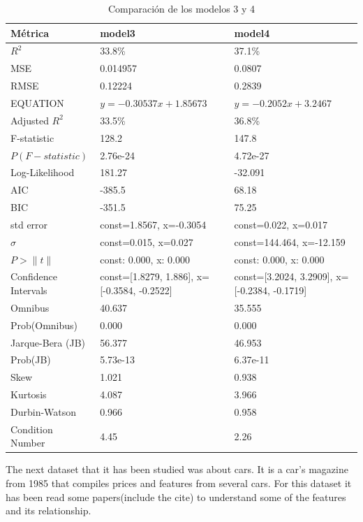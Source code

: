\documentclass{article}
\begin{document}
  \begin{table}[h]
  \centering
  \small %
  \begin{tabular}{|l|l|l|}
  \hline
  \textbf{Métrica} & \textbf{model3} & \textbf{model4} \\
  \hline
  $R^2$ & 33.8\% & 37.1\% \\
  \hline
  MSE & 0.014957 & 0.0807 \\
  \hline
  RMSE & 0.12224 & 0.2839 \\
  \hline
  EQUATION & $y=-0.30537x+1.85673$ & $y=-0.2052x+3.2467$ \\
  \hline
  Adjusted $R^2$ & 33.5\% & 36.8\% \\
  \hline
  F-statistic & 128.2 & 147.8 \\
  \hline
  $P(F-statistic)$ & 2.76e-24 & 4.72e-27 \\
  \hline
  Log-Likelihood & 181.27 & -32.091 \\
  \hline
  AIC & -385.5 & 68.18 \\
  \hline
  BIC & -351.5 & 75.25 \\
  \hline
  std error & const=1.8567, x=-0.3054 & const=0.022, x=0.017 \\
  \hline
  $\sigma$ & const=0.015, x=0.027 & const=144.464, x=-12.159 \\
  \hline
  $P>\|t\|$ & const: 0.000, x: 0.000 & const: 0.000, x: 0.000 \\
  \hline
  Confidence Intervals & const=[1.8279, 1.886], x=[-0.3584, -0.2522] & const=[3.2024, 3.2909], x=[-0.2384, -0.1719] \\
  \hline
  Omnibus & 40.637 & 35.555 \\
  \hline
  Prob(Omnibus) & 0.000 & 0.000 \\
  \hline
  Jarque-Bera (JB) & 56.377 & 46.953 \\
  \hline
  Prob(JB) & 5.73e-13 & 6.37e-11 \\
  \hline
  Skew & 1.021 & 0.938 \\
  \hline
  Kurtosis & 4.087 & 3.966 \\
  \hline
  Durbin-Watson & 0.966 & 0.958 \\
  \hline
  Condition Number & 4.45 & 2.26 \\
  \hline
  \end{tabular}
  \caption{Comparación de los modelos 3 y 4}
  \label{tab:modelos34}
  \end{table}



The next dataset that it has been studied was about cars. It is a car's magazine from 1985 that compiles prices and features from several cars. 
For this dataset it has been read some papers(include the cite) to understand some of the features and its relationship. 
\end{document}
